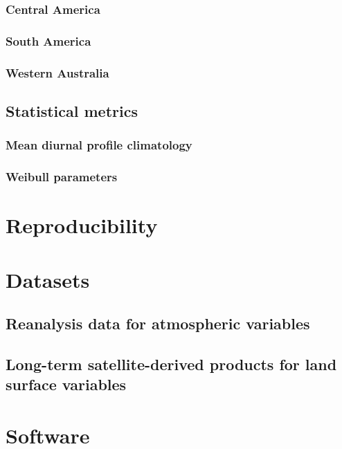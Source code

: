 \documentclass[12pt,a4paper,twoside]{book}
\begin{document}
\subsubsection{Central America}

\subsubsection{South America}

\subsubsection{Western Australia}

\subsection{Statistical metrics}

\subsubsection{Mean diurnal profile climatology}

\subsubsection{Weibull parameters}

\section{Reproducibility}

\section{Datasets}

\subsection{Reanalysis data for atmospheric variables}

\subsection{Long-term satellite-derived products for land surface variables}

\section{Software}
\end{document}
